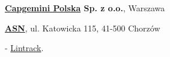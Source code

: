 \documentclass[10pt]{article}
\renewcommand{\section}[2]%
        {\pagebreak[2]\vspace{1.4\baselineskip}%
         \phantomsection\addcontentsline{toc}{section}{#1}%
         \hspace{0in}%
         \marginpar{
         \raggedright \scshape #1}#2}
\newenvironment{outerlist}[1][\enskip\textbullet]%
        {\begin{itemize}[#1]}{\end{itemize}%
         \vspace{-.6\baselineskip}}
\newenvironment{innerlist}[1][\enskip\textbullet]%
        {\begin{compactitem}[#1]}{\end{compactitem}}
\newcommand{\blankline}{\quad\pagebreak[2]}
\begin{document}
%
\textbf{\href{http://www.capgemini.pl/}{Capgemini Polska} Sp. z o.o.}, 
Warszawa
\begin{outerlist}

\item[] \textit{
}%
        \hfill \textbf{
}
\begin{innerlist}
\item
\end{innerlist}

\end{outerlist}

\blankline

\href{http://asn.pl/}{\textbf{ASN}}, 
ul. Katowicka 115, 41-500 Chorzów
\begin{outerlist}

\item[] \textit{
}%
        \hfill \textbf{
}
\begin{innerlist}
\item
\item 
\item
- \href{http://lintrack.org}{Lintrack}.
\end{innerlist}

\end{outerlist}
\end{document}
